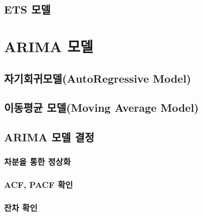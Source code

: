\documentclass[
]{book}
\begin{document}
\hypertarget{ets-uxbaa8uxb378}{%
\subsection{ETS 모델}\label{ets-uxbaa8uxb378}}

\hypertarget{arima-uxbaa8uxb378}{%
\section{ARIMA 모델}\label{arima-uxbaa8uxb378}}

\hypertarget{uxc790uxae30uxd68cuxadc0uxbaa8uxb378autoregressive-model}{%
\subsection{자기회귀모델(AutoRegressive Model)}\label{uxc790uxae30uxd68cuxadc0uxbaa8uxb378autoregressive-model}}

\hypertarget{uxc774uxb3d9uxd3c9uxade0-uxbaa8uxb378moving-average-model}{%
\subsection{이동평균 모델(Moving Average Model)}\label{uxc774uxb3d9uxd3c9uxade0-uxbaa8uxb378moving-average-model}}

\hypertarget{arima-uxbaa8uxb378-uxacb0uxc815}{%
\subsection{ARIMA 모델 결정}\label{arima-uxbaa8uxb378-uxacb0uxc815}}

\hypertarget{uxcc28uxbd84uxc744-uxd1b5uxd55c-uxc815uxc0c1uxd654}{%
\subsubsection{차분을 통한 정상화}\label{uxcc28uxbd84uxc744-uxd1b5uxd55c-uxc815uxc0c1uxd654}}

\hypertarget{acf-pacf-uxd655uxc778}{%
\subsubsection{ACF, PACF 확인}\label{acf-pacf-uxd655uxc778}}

\hypertarget{uxc794uxcc28-uxd655uxc778}{%
\subsubsection{잔차 확인}\label{uxc794uxcc28-uxd655uxc778}}
\end{document}
